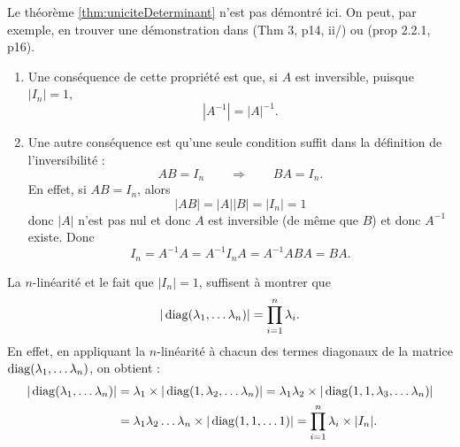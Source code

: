 \proof
Le théorème \ref{thm:uniciteDeterminant} n'est pas démontré ici. On peut, par exemple, en trouver une démonstration dans \cite{GAJ94} (Thm 3, p14, ii/) ou \cite{Ser01} (prop 2.2.1, p16).
\eproof

\remarks 
\begin{enumerate}
  \item Une conséquence de cette propriété est que, si $A$ est inversible, puisque $|I_n| = 1$,
  $$
  |A^{-1}| = |A|^{-1}.
  $$
  \item Une autre conséquence est qu'une seule condition suffit dans la définition de l'inversibilité : 
  $$
  AB = I_n \qquad \Rightarrow \qquad BA = I_n.
  $$
  En effet, si $AB = I_n$, alors
  $$
  |AB| = |A| |B| = |I_n| = 1
  $$
  donc $|A|$ n'est pas nul et donc $A$ est inversible (de même que $B$) et donc $A^{-1}$ existe. Donc
  $$
  I_n = A^{-1} A = A^{-1} I_n A = A^{-1} A B A = B A.
  $$
\end{enumerate}

\remark
La $n$-linéarité et le fait que $|I_n| = 1$, suffisent à montrer que 
\begin{equation} \label{eq:determiantMatriceDiagonale}
|\operatorname{diag}(\lambda_1, \dots \lambda_n)| = \prod_{i = 1}^n \lambda_i.
\end{equation}
En effet, en appliquant la $n$-linéarité à chacun des termes diagonaux de la matrice $\operatorname{diag}(\lambda_1, \dots \lambda_n)$, on obtient : 
\begin{align*}
|\operatorname{diag}(\lambda_1, \dots \lambda_n)| 
& = \lambda_1 \times |\operatorname{diag}(1, \lambda_2, \dots \lambda_n)|
= \lambda_1 \lambda_2 \times |\operatorname{diag}(1, 1, \lambda_3, \dots \lambda_n)| \\
& = \lambda_1 \lambda_2 \dots \lambda_n \times |\operatorname{diag}(1, 1, \dots 1)|
= \prod_{i=1}^n \lambda_i \times |I_n|.
\end{align*}

